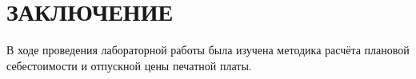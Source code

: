 \section*{ЗАКЛЮЧЕНИЕ}

В ходе проведения лабораторной работы была изучена методика расчёта
плановой себестоимости и отпускной цены печатной платы.

\newpage
